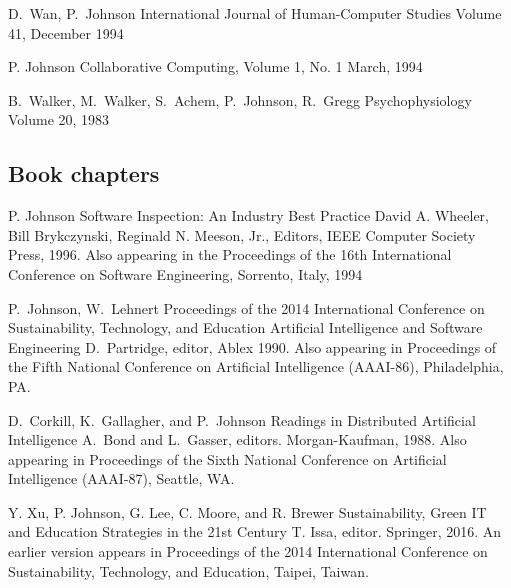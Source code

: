 \documentclass[11pt,letterpaper,sans]{moderncv} %
\begin{document}
          {D.~Wan, P.~Johnson}
          {International Journal of Human-Computer Studies}
          {Volume 41, December 1994}

          {P. Johnson}
          {Collaborative Computing, Volume 1, No. 1}
          {March, 1994}

          {B.~Walker, M.~Walker, S.~Achem, P.~Johnson, R.~Gregg}
          {Psychophysiology}
          {Volume 20, 1983}

\subsection{Book chapters}


          {P. Johnson}
          {Software Inspection:  An Industry Best Practice}
          {David A. Wheeler, Bill Brykczynski, Reginald N. Meeson, Jr., Editors, IEEE Computer Society Press, 1996.
          Also appearing in the Proceedings of the 16th International Conference on Software Engineering, Sorrento, Italy, 1994}

          {P.~Johnson, W.~Lehnert}
Proceedings of the 2014 International Conference on Sustainability, Technology, and Education          {Artificial Intelligence and Software Engineering}
          {D.~Partridge, editor, Ablex 1990. Also appearing in Proceedings of the Fifth National Conference on
  Artificial Intelligence (AAAI-86), Philadelphia, PA.}

          {D.~Corkill, K.~Gallagher, and P.~Johnson}
          {Readings in Distributed Artificial Intelligence}
          {A.~Bond and L.~Gasser, editors.  Morgan-Kaufman, 1988.  Also appearing in Proceedings of the Sixth National Conference on Artificial Intelligence (AAAI-87), Seattle, WA.}

          {Y. Xu, P.  Johnson, G. Lee, C. Moore, and R. Brewer}
          {Sustainability, Green IT and Education Strategies in the 21st Century}
          {T. Issa, editor.  Springer, 2016.  An earlier version appears in Proceedings of the 2014 International Conference on Sustainability, Technology, and Education, Taipei, Taiwan.}
\end{document}
